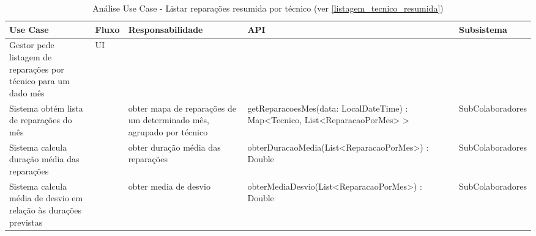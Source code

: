 \documentclass[../relatorio.tex]{subfiles}
\begin{document}
\begin{landscape}
    \begin{table}[!h]
        \centering
        \begin{tabular}{|p{5cm}|p{1cm}|p{4cm}|p{6cm}|p{4cm}|}
            \hline
            \rowcolor{gray!20!white}
            Use Case & Fluxo & Responsabilidade & API & Subsistema \\
            \hline
            \rowcolor{yellow}
            Gestor pede listagem de reparações por técnico para um dado mês %
                     & 
            UI
                     & 
                     & 
                     & 
            \\
            \hline
            Sistema obtém lista de reparações do mês
                     & 
                     & 
            obter mapa de reparações de um determinado mês, agrupado por técnico
                     & 
            getReparacoesMes(data: LocalDateTime) : Map<Tecnico, List<ReparacaoPorMes> >
                     & 
            SubColaboradores
            \\
            \hline
            Sistema calcula duração média das reparações
                     & 
                     & 
            obter duração média das reparações
                     & 
            obterDuracaoMedia(List<ReparacaoPorMes>) : Double
                     & 
            SubColaboradores
            \\
            \hline
            Sistema calcula média de desvio em relação às durações previstas
                     & 
                     & 
            obter media de desvio
                     & 
            obterMediaDesvio(List<ReparacaoPorMes>) : Double
                     & 
            SubColaboradores
            \\
            \hline
        \end{tabular}
        \caption{Análise Use Case - Listar reparações resumida por técnico (ver \ref{listagem_tecnico_resumida})}
    \end{table}
\end{landscape}
\end{document}
